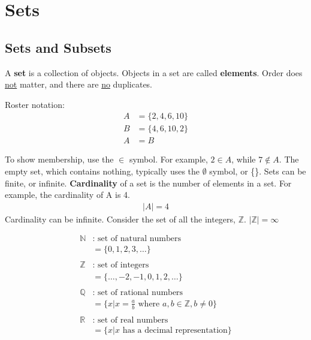 \section{Sets}
\subsection{Sets and Subsets}

A \textbf{set} is a collection of objects. Objects in a set are called \textbf{elements}.
Order does \underline{not} matter, and there are \underline{no} duplicates.

Roster notation:
\begin{align*}
  A & = \{2, 4, 6, 10\} \\
  B & = \{4, 6, 10, 2\} \\
  A & = B
\end{align*}

To show membership, use the \(\in\) symbol. For example, \(2 \in A\), while \(7 \not \in A\).
The empty set, which contains nothing, typically uses the \(\emptyset\) symbol, or \{\}.
Sets can be finite, or infinite. \textbf{Cardinality} of a set is the number of elements in a set.
For example, the cardinality of A is 4.
\begin{align*}
  \left\lvert A\right\rvert = 4
\end{align*}
Cardinality can be infinite. Consider the set of all the integers, \(\mathbb{Z}\). \(\left\lvert \mathbb{Z}\right\rvert = \infty\)

\begin{align*}
  \mathbb{N} & : \text{ set of natural numbers}                                         \\
             & = \{0, 1, 2, 3, \ldots\}                                                 \\
  \\
  \mathbb{Z} & : \text{ set of integers}                                                \\
             & = \{\ldots, -2, -1, 0, 1, 2, \ldots\}                                    \\
  \\
  \mathbb{Q} & : \text{ set of rational numbers}                                        \\
             & = \{x | x = \frac{a}{b} \text{ where } a, b \in \mathbb{Z}, b \not = 0\} \\
  \\
  \mathbb{R} & : \text{ set of real numbers}                                            \\
             & = \{x | x \text{ has a decimal representation}\}
\end{align*}

